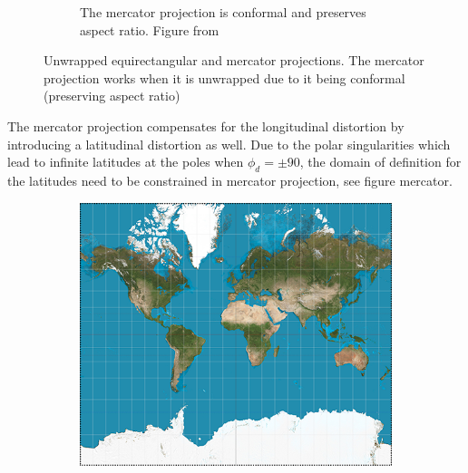 \begin{figure}[htbp]
\begin{subfigure}[t]{0.3\textwidth}
        \caption{The mercator projection is conformal and preserves aspect ratio. Figure from \cite{worldimagery}}
    \end{subfigure}
    \caption{Unwrapped equirectangular and mercator projections. The mercator projection works when it is unwrapped due to it being conformal (preserving aspect ratio)}
    \label{fig:mercator}
\end{figure}

The mercator projection compensates for the longitudinal distortion by introducing a latitudinal distortion as well. Due to the polar singularities which lead to infinite latitudes at the poles when $\phi_d = \pm 90$, the domain of definition for the latitudes need to be constrained in mercator projection, see figure mercator.

\begin{figure}[htbp]
    \centering
    \begin{subfigure}[bt]{0.4\textwidth}
        \includegraphics[width=\textwidth]{figures/developable_projected/mercator.png}
    \end{subfigure}
    \qquad
    \begin{subfigure}[bt]{0.15\textwidth}

\end{subfigure}
\end{figure}
